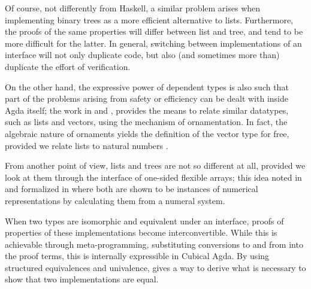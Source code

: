 \documentclass{article}
\theoremstyle{plain}%
\theoremstyle{definition}
\begin{document}
Of course, not differently from Haskell, a similar problem arises when implementing binary trees as a more efficient alternative to lists. Furthermore, the proofs of the same properties will differ between list and tree, and tend to be more difficult for the latter. In general, switching between implementations of an interface will not only duplicate code, but also (and sometimes more than) duplicate the effort of verification.

On the other hand, the expressive power of dependent types is also such that part of the problems arising from safety or efficiency can be dealt with inside Agda itself; the work in \cite{orntrans} and \cite{progorn}, provides the means to relate similar datatypes, such as lists and vectors, using the mechanism of ornamentation. %
In fact, the algebraic nature of ornaments yields the definition of the vector type for free, provided we relate lists to natural numbers \cite{algorn}. %

From another point of view, lists and trees are not so different at all, provided we look at them through the interface of one-sided flexible arrays; this idea noted in \cite{purelyfunctional} and formalized in \cite{calcdata} where both are shown to be instances of numerical representations by calculating them from a numeral system. 

When two types are isomorphic and equivalent under an interface, proofs of properties of these implementations become interconvertible. While this is achievable through meta-programming, substituting conversions to and from into the proof terms, this is internally expressible in Cubical Agda. By using structured equivalences and univalence, \cite{iri} gives a way to derive what is necessary to show that two implementations are equal.

\end{document}
